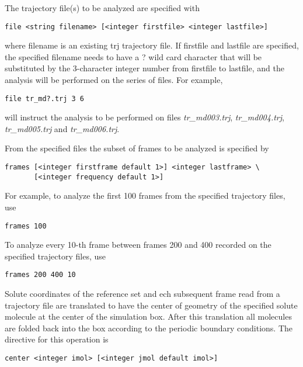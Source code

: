 The trajectory file(s) to be analyzed are specified with

\begin{verbatim}
file <string filename> [<integer firstfile> <integer lastfile>] 
\end{verbatim}

where {\rm filename} is an existing {\rm trj} trajectory file.
If {\rm firstfile} and {\rm lastfile} are specified, the specified
{\rm filename} needs to have a {\rm ?} wild card character that will 
be substituted by the 3-character integer number from {\rm firstfile} 
to {\rm lastfile}, and the analysis will be performed on the series 
of files.
For example,

\begin{verbatim}
file tr_md?.trj 3 6
\end{verbatim}

will instruct the analysis to be performed on files {\it tr\_md003.trj},
{\it tr\_md004.trj}, {\it tr\_md005.trj} and {\it tr\_md006.trj}.

\par
From the specified files the subset of frames to be analyzed is 
specified by

\begin{verbatim}
frames [<integer firstframe default 1>] <integer lastframe> \
       [<integer frequency default 1>]
\end{verbatim}

For example, to analyze the first 100 frames from the specified
trajectory files, use

\begin{verbatim}
frames 100
\end{verbatim}

To analyze every 10-th frame between frames 200 and 400 recorded on
the specified trajectory files, use

\begin{verbatim}
frames 200 400 10
\end{verbatim}

Solute coordinates of the reference set and ech subsequent frame
read from a trajectory file are translated to have the center of
geometry of the specified solute molecule at the center of the
simulation box. After this translation all molecules are folded
back into the box according to the periodic boundary conditions.
The directive for this operation is

\begin{verbatim}
center <integer imol> [<integer jmol default imol>]
\end{verbatim}

